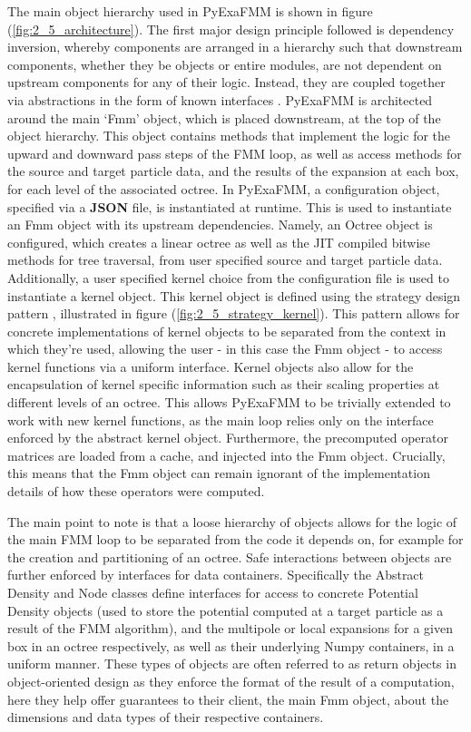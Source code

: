 The main object hierarchy used in \gls{PyExaFMM} is shown in figure
(\ref{fig:2_5_architecture}). The first major design principle followed is dependency
inversion, whereby components are arranged in a hierarchy such that downstream
components, whether they be objects or entire modules, are not dependent on
upstream components for any of their logic. Instead, they are coupled together via
abstractions in the form of known interfaces \cite{Gamma:1994:Addison}. \gls{PyExaFMM} is architected
around the main `Fmm' object, which is placed downstream, at the top of the object hierarchy.
This object contains methods that implement the logic for the
upward and downward pass steps of the \gls{FMM} loop, as well as access methods
for the source and target particle data, and the results of the expansion at each box, for each level of the associated octree.
In \gls{PyExaFMM}, a configuration object, specified via a \textbf{\gls{JSON}} file, is instantiated
at runtime. This is used to instantiate an Fmm object with its upstream dependencies.
Namely, an Octree object is configured, which creates a linear octree as well
as the \gls{JIT} compiled bitwise methods for tree traversal, from user
specified source and target particle data. Additionally, a user specified kernel choice
from the configuration file is used to instantiate a kernel object.
This kernel object is defined using the strategy design pattern
\cite{Gamma:1994:Addison}, illustrated in figure (\ref{fig:2_5_strategy_kernel}).
This pattern allows for concrete implementations of kernel objects to be separated
from the context in which they're used, allowing the user - in this case the
Fmm object - to access kernel functions via a uniform interface. Kernel
objects also allow for the encapsulation of
kernel specific information such as their scaling properties at different levels
of an octree.  This allows \gls{PyExaFMM} to be trivially extended to work with
new kernel functions, as the main loop relies only on the interface enforced by the
abstract kernel object. Furthermore, the precomputed operator matrices are loaded from a cache,
and injected into the Fmm object. Crucially, this means that the Fmm object can
remain ignorant of the implementation details of how these operators were computed.

The main point to note is that a loose hierarchy of objects allows for
the logic of the main \gls{FMM} loop to be separated from the code it depends on,
 for example for the creation and partitioning of an octree.
 Safe interactions between objects are further enforced by interfaces for data containers.
Specifically the Abstract Density and Node classes define interfaces for access to concrete Potential Density
objects (used to store the potential computed at a target particle as a result
of the FMM algorithm), and the multipole or local expansions for a given box in an octree respectively,
as well as their underlying Numpy containers, in a uniform manner.
These types of objects are often referred to as return objects in object-oriented
design as they enforce the format of the result of a computation,
here they help offer guarantees to their client, the main Fmm object,
about the dimensions and data types of their respective containers.

